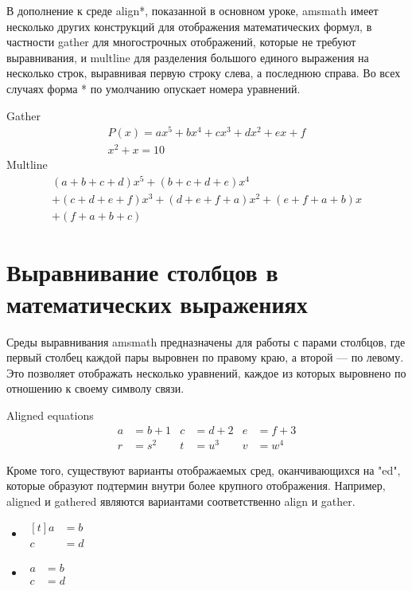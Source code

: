 \documentclass[leqno]{article}
\begin{document}
  В дополнение к среде align*, показанной в основном уроке, amsmath имеет
  несколько других конструкций для отображения математических формул, в частности gather для многострочных отображений,
  которые не требуют выравнивания, и multline для разделения большого единого выражения на
  несколько строк, выравнивая первую строку слева, а последнюю справа. Во всех случаях
  форма * по умолчанию опускает номера уравнений.

  \begin{center}
    Gather
    \begin{gather}
    P(x)=ax^{5}+bx^{4}+cx^{3}+dx^{2}+ex +f\\
    x^2+x=10
    \end{gather}
    Multline
    \begin{multline*}
    (a+b+c+d)x^{5}+(b+c+d+e)x^{4} \\
    +(c+d+e+f)x^{3}+(d+e+f+a)x^{2}+(e+f+a+b)x\\
    + (f+a+b+c)
    \end{multline*}
  \end{center}


  \section{Выравнивание столбцов в математических выражениях}
  \label{sec:colms}

  Среды выравнивания amsmath предназначены для работы с парами столбцов, где
  первый столбец каждой пары выровнен по правому краю, а второй — по левому.
  Это позволяет отображать несколько уравнений, каждое из которых выровнено по отношению к своему символу связи.

  \begin{center}
    Aligned equations
    \begin{align*}
    a &= b+1 & c &= d+2 & e &= f+3 \\
    r &= s^{2} & t &=u^{3} & v &= w^{4}
    \end{align*}
  \end{center}

  Кроме того, существуют варианты отображаемых сред, оканчивающихся на "ed", которые образуют
  подтермин внутри более крупного отображения. Например, aligned и gathered являются вариантами
  соответственно align и gather.

  \begin{center}
    \begin{itemize}
    \item
    $\begin{aligned}[t]
    a&=b\\
    c&=d
    \end{aligned}$
    \item
    $\begin{aligned}
    a&=b\\
    c&=d
    \end{aligned}$
    \end{itemize}
  \end{center}
\end{document}
